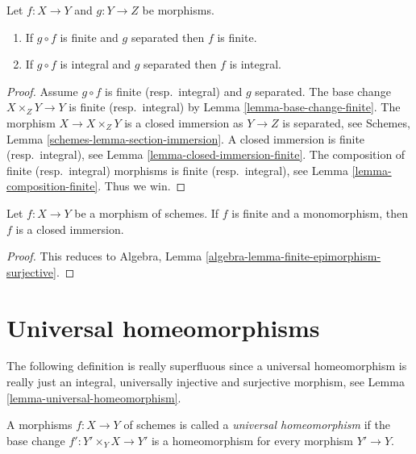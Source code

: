 \begin{lemma}
\label{lemma-finite-permanence}
Let $f : X \to Y$ and $g : Y \to Z$ be morphisms.
\begin{enumerate}
\item If $g \circ f$ is finite and $g$ separated then $f$ is finite.
\item If $g \circ f$ is integral and $g$ separated then $f$ is integral.
\end{enumerate}
\end{lemma}

\begin{proof}
Assume $g \circ f$ is finite (resp.\ integral) and $g$ separated.
The base change $X \times_Z Y \to Y$ is finite (resp.\ integral) by
Lemma \ref{lemma-base-change-finite}.
The morphism $X \to X \times_Z Y$ is
a closed immersion as $Y \to Z$ is separated, see
Schemes, Lemma \ref{schemes-lemma-section-immersion}.
A closed immersion is finite (resp.\ integral),
see Lemma \ref{lemma-closed-immersion-finite}.
The composition of finite (resp.\ integral) morphisms is finite
(resp.\ integral),
see Lemma \ref{lemma-composition-finite}. Thus we win.
\end{proof}

\begin{lemma}
\label{lemma-finite-monomorphism-closed}
Let $f : X \to Y$ be a morphism of schemes.
If $f$ is finite and a monomorphism, then $f$ is a closed immersion.
\end{lemma}

\begin{proof}
This reduces to
Algebra, Lemma \ref{algebra-lemma-finite-epimorphism-surjective}.
\end{proof}







\section{Universal homeomorphisms}
\label{section-universal-homeomorphisms}

\noindent
The following definition is really superfluous since a universal
homeomorphism is really just an integral, universally injective
and surjective morphism, see
Lemma \ref{lemma-universal-homeomorphism}.

\begin{definition}
\label{definition-universal-homeomorphism}
A morphisms $f : X \to Y$ of schemes is called a {\it universal homeomorphism}
if the base change $f' : Y' \times_Y X \to Y'$ is a homeomorphism for
every morphism $Y' \to Y$.
\end{definition}

